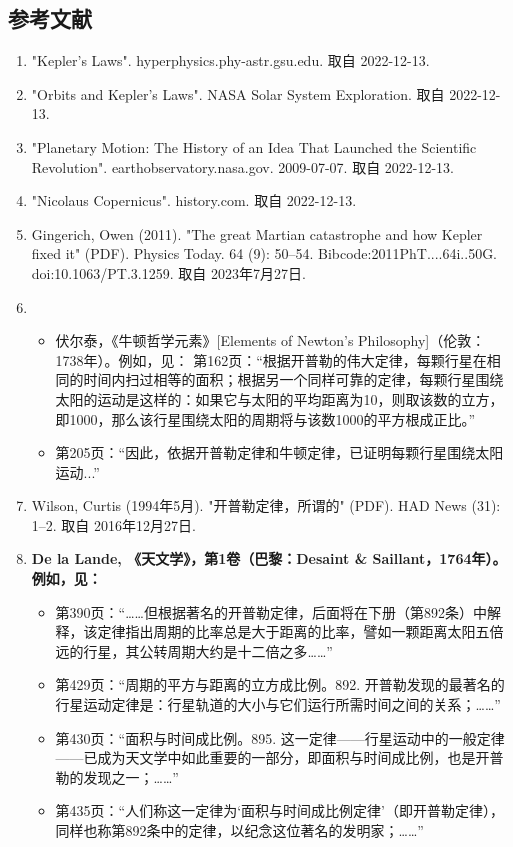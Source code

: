 \subsection{参考文献 }
\begin{enumerate}
\item "Kepler's Laws". hyperphysics.phy-astr.gsu.edu. 取自 2022-12-13.  
\item "Orbits and Kepler's Laws". NASA Solar System Exploration. 取自 2022-12-13.  
\item "Planetary Motion: The History of an Idea That Launched the Scientific Revolution". earthobservatory.nasa.gov. 2009-07-07. 取自 2022-12-13.  
\item "Nicolaus Copernicus". history.com. 取自 2022-12-13.  
\item Gingerich, Owen (2011). "The great Martian catastrophe and how Kepler fixed it" (PDF). Physics Today. 64 (9): 50–54. Bibcode:2011PhT....64i..50G. doi:10.1063/PT.3.1259. 取自 2023年7月27日.  
\item \begin{itemize}
\item 伏尔泰，《牛顿哲学元素》[Elements of Newton's Philosophy]（伦敦：1738年）。例如，见：  
第162页：“根据开普勒的伟大定律，每颗行星在相同的时间内扫过相等的面积；根据另一个同样可靠的定律，每颗行星围绕太阳的运动是这样的：如果它与太阳的平均距离为10，则取该数的立方，即1000，那么该行星围绕太阳的周期将与该数1000的平方根成正比。”  
\item 第205页：“因此，依据开普勒定律和牛顿定律，已证明每颗行星围绕太阳运动...” 
\end{itemize} 
\item Wilson, Curtis (1994年5月). "开普勒定律，所谓的" (PDF). HAD News (31): 1–2. 取自 2016年12月27日.
\item \textbf{De la Lande, 《天文学》，第1卷（巴黎：Desaint & Saillant，1764年）。例如，见：} 
\begin{itemize}
\item 第390页：“……但根据著名的开普勒定律，后面将在下册（第892条）中解释，该定律指出周期的比率总是大于距离的比率，譬如一颗距离太阳五倍远的行星，其公转周期大约是十二倍之多……”  
\item 第429页：“周期的平方与距离的立方成比例。892. 开普勒发现的最著名的行星运动定律是：行星轨道的大小与它们运行所需时间之间的关系；……”  
\item 第430页：“面积与时间成比例。895. 这一定律——行星运动中的一般定律——已成为天文学中如此重要的一部分，即面积与时间成比例，也是开普勒的发现之一；……”  
\item 第435页：“人们称这一定律为‘面积与时间成比例定律’（即开普勒定律），同样也称第892条中的定律，以纪念这位著名的发明家；……”

\end{itemize}
\end{enumerate}
